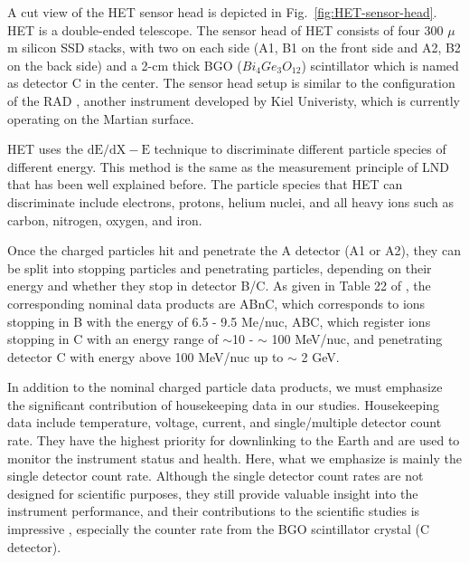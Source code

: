 A cut view of the \ac{HET} sensor head is depicted in Fig.~\ref{fig:HET-sensor-head}. \ac{HET} is a double-ended telescope. The sensor head of \ac{HET} consists of four 300 $\mu$m silicon \ac{SSD} stacks, with two on each side (A1, B1 on the front side and A2, B2 on the back side) and a 2-cm thick \ac{BGO} ($Bi_{4}Ge_{3}O_{12}$) scintillator which is named as detector C in the center. The sensor head setup is similar to the configuration of the \ac{RAD} \citep{Hassler-2012-MSLRAD}, another instrument developed by Kiel Univeristy, which is currently operating on the Martian surface.  

\ac{HET} uses the $\mathrm{dE/dX - E}$ technique to discriminate different particle species of different energy. This method is the same as the measurement principle of \ac{LND} that has been well explained before. The particle species that \ac{HET} can discriminate include electrons, protons, helium nuclei, and all heavy ions such as carbon, nitrogen, oxygen, and iron.  

Once the charged particles hit and penetrate the A detector (A1 or A2), they can be split into stopping particles and penetrating particles, depending on their energy and whether they stop in detector B/C. As given in Table 22 of \citet{RodriguezPacheco-2019-EPD}, the corresponding nominal data products are ABnC, which corresponds to ions stopping in B with the energy of 6.5 - 9.5 Me/nuc, ABC, which register ions stopping in C with an energy range of $\sim$10 - $\sim$ 100 MeV/nuc, and penetrating detector C with energy above 100 MeV/nuc up to $\sim$ 2 GeV.



In addition to the nominal charged particle data products, we must emphasize the significant contribution of housekeeping data in our studies. Housekeeping data include temperature, voltage, current, and single/multiple detector count rate.  
They have the highest priority for downlinking to the Earth and are used to monitor the instrument status and health. Here, what we emphasize is mainly the single detector count rate. Although the single detector count rates are not designed for scientific purposes, they still provide valuable insight into the instrument performance, and their contributions to the scientific studies is impressive \citep{Wimmer2021AA}, especially the counter rate from the \ac{BGO} scintillator crystal (C detector). 

